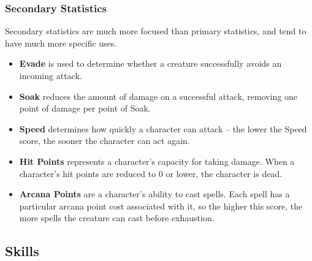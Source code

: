 \subsubsection{Secondary Statistics}

Secondary statistics are much more focused than primary statistics, and
tend to have much more specific uses.

\begin{itemize}
\item {\bf Evade} is used to determine whether a creature successfully
avoids an incoming attack.

\item {\bf Soak} reduces the amount of damage on a successful attack,
removing one point of damage per point of Soak.

\item {\bf Speed} determines how quickly a character can attack -- the
lower the Speed score, the sooner the character can act again.

\item {\bf Hit Points} represents a character's capacity for taking damage.
When a character's hit points are reduced to 0 or lower, the character is
dead.

\item {\bf Arcana Points} are a character's ability to cast spells.  Each
spell has a particular arcana point cost associated with it, so the higher
this score, the more spells the creature can cast before exhaustion.
\end{itemize}

\subsection{Skills}

